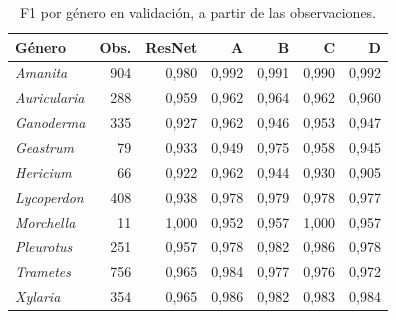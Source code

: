 \begin{table}[H]
\centering
\small
\caption{F1 por género en validación, a partir de las observaciones.}
\label{tab:genus}
\begin{tabularx}{\linewidth}{Y r r r r r r}
\toprule
\textbf{Género} & \textbf{Obs.} & \textbf{ResNet} & \textbf{A} & \textbf{B} & \textbf{C} & \textbf{D}\\
\midrule
\textit{Amanita} & 904 & 0,980 & 0,992 & 0,991 & 0,990 & 0,992\\
\textit{Auricularia} & 288 & 0,959 & 0,962 & 0,964 & 0,962 & 0,960\\
\textit{Ganoderma} & 335 & 0,927 & 0,962 & 0,946 & 0,953 & 0,947\\
\textit{Geastrum} & 79 & 0,933 & 0,949 & 0,975 & 0,958 & 0,945\\
\textit{Hericium} & 66 & 0,922 & 0,962 & 0,944 & 0,930 & 0,905\\
\textit{Lycoperdon} & 408 & 0,938 & 0,978 & 0,979 & 0,978 & 0,977\\
\textit{Morchella} & 11 & 1,000 & 0,952 & 0,957 & 1,000 & 0,957\\
\textit{Pleurotus} & 251 & 0,957 & 0,978 & 0,982 & 0,986 & 0,978\\
\textit{Trametes} & 756 & 0,965 & 0,984 & 0,977 & 0,976 & 0,972\\
\textit{Xylaria} & 354 & 0,965 & 0,986 & 0,982 & 0,983 & 0,984\\
\bottomrule
\end{tabularx}
\end{table}
